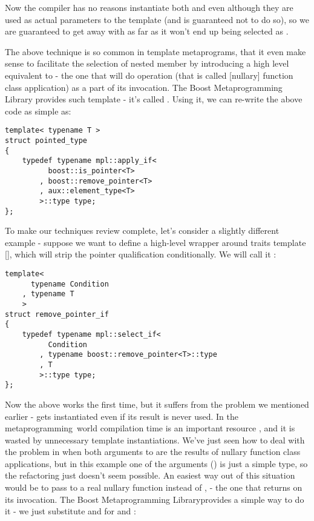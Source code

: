 \documentclass{kapproc}
\newcommand{\Mpl}{Boost Meta\-pro\-gram\-ming Library}
\newcommand{\mping}{meta\-pro\-gram\-ming}
\begin{document}
Now the compiler has no reasons instantiate both 
 and 
 even although they are used as 
actual parameters to the  template (and is 
guaranteed not to do so), so we are guaranteed to get away with 
 as far as it won't end up being 
selected as .

The above technique is so common in template metaprograms, that it
even make sense to facilitate the selection of nested  member
by introducing a high level equivalent to  - the one
that will do  operation (that is called [nullary]
function class application) as a part of its invocation.  The \Mpl
provides such template - it's called . Using it, we
can re-write the above code as simple as:

{\small
\begin{codesamp}\begin{verbatim}
template< typename T >
struct pointed_type
{
    typedef typename mpl::apply_if<
          boost::is_pointer<T>
        , boost::remove_pointer<T>
        , aux::element_type<T>
        >::type type;
};
\end{verbatim}
\end{codesamp}
}

To make our techniques review complete, let's consider a slightly 
different example - suppose we want to define a high-level wrapper 
around  traits template [], which will 
strip the pointer qualification conditionally. We will call it 
:

{\small
\begin{codesamp}\begin{verbatim}
template<
      typename Condition
    , typename T
    >
struct remove_pointer_if
{
    typedef typename mpl::select_if<
          Condition
        , typename boost::remove_pointer<T>::type
        , T
        >::type type;
};
\end{verbatim}
\end{codesamp}
}

Now the above works the first time, but it suffers from the problem we
mentioned earlier -  gets
instantiated even if its result is never used. In the \mping\ world
compilation time is an important resource \cite{Abr01}, and it is
wasted by unnecessary template instantiations. We've just seen how to
deal with the problem in when both arguments to 
are the results of nullary function class applications, but in this
example one of the arguments () is just a simple type,
so the refactoring just doesn't seem possible. An easiest way out of
this situation would be to pass to  a real nullary
function instead of , - the one that returns  on its
invocation. The \Mpl provides a simple way to do it - we just
substitute  and  for  and
:
\end{document}
